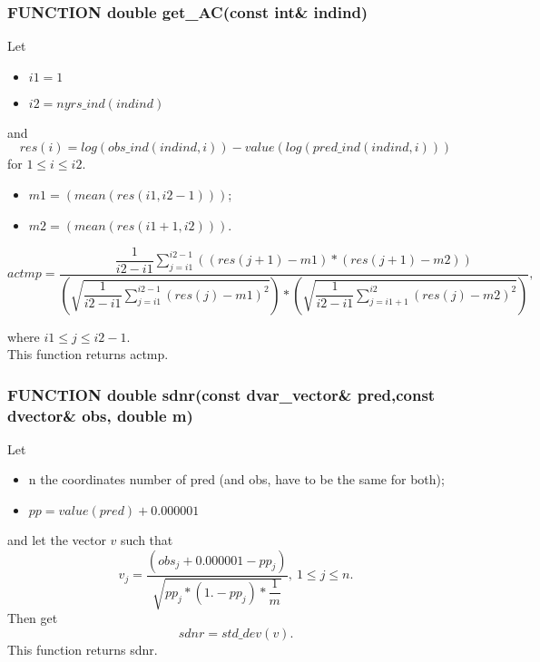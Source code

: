 \documentclass{article}
\begin{document}
\subsubsection{FUNCTION double get\_AC(const int\& indind)}
Let 
\begin{itemize}
    \item $i1=1$
    \item $i2 = nyrs\_ind(indind)$
\end{itemize}
and
\begin{equation}
    res(i) = log(obs\_ind(indind,i)) - value(log(pred\_ind(indind,i)))
\end{equation}
for $1\leq i \leq i2$.\\

\begin{itemize}
    \item $m1 = (mean(res(i1,i2-1)))$;
    \item $m2 = (mean(res(i1+1,i2))).$
\end{itemize}

\begin{equation}
    actmp = \dfrac{\dfrac{1}{i2-i1}\displaystyle\sum_{j=i1}^{i2-1}\left((res(j+1) - m1)*(res(j+1) - m2)\right)}{\left(\sqrt{\dfrac{1}{i2-i1}\displaystyle\sum_{j=i1}^{i2-1}(res(j) - m1 )^2} \right) * \left(\sqrt{\dfrac{1}{i2-i1}\displaystyle\sum_{j=i1+1}^{i2}(res(j) - m2 )^2} \right)},
\end{equation}

where $i1\leq j \leq i2-1$.\\
This function returns actmp.\\

\subsubsection{FUNCTION double sdnr(const dvar\_vector\& pred,const dvector\& obs, double m)}
Let
\begin{itemize}
    \item n the coordinates number of pred (and obs, have to be the same for both);
    \item $pp = value(pred)+0.000001$
\end{itemize}
and let the vector $v$ such that
\begin{equation}
    v_j=\dfrac{(obs_j+0.000001-pp_j)}{\sqrt{pp_j*(1.-pp_j)*\dfrac{1}{m}}}, \ 1\leq j \leq n.
\end{equation}
Then get
\begin{equation}
    sdnr = std\_dev\left(v\right).
\end{equation}
This function returns sdnr.
\end{document}
